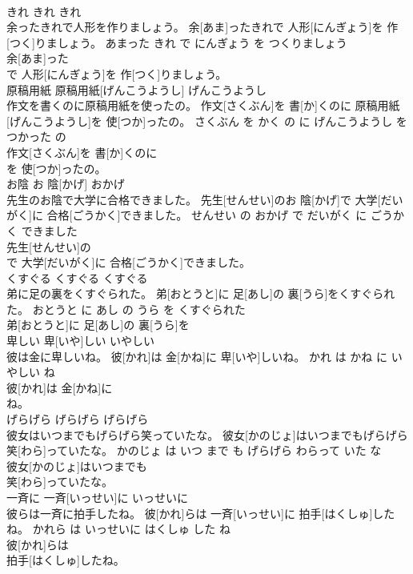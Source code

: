 \documentclass[8pt]{extreport}
\begin{document}
\begin{CJK}{UTF8}{min}
\\	きれ	きれ	きれ	
\\	余ったきれで人形を作りましょう。	余[あま]ったきれで 人形[にんぎょう]を 作[つく]りましょう。	あまった きれ で にんぎょう を つくりましょう	
\\	余[あま]った
\\	で 人形[にんぎょう]を 作[つく]りましょう。			
\\	原稿用紙	原稿用紙[げんこうようし]	げんこうようし	
\\	作文を書くのに原稿用紙を使ったの。	作文[さくぶん]を 書[か]くのに 原稿用紙[げんこうようし]を 使[つか]ったの。	さくぶん を かく の に げんこうようし を つかった の	
\\	作文[さくぶん]を 書[か]くのに
\\	を 使[つか]ったの。			
\\	お陰	お 陰[かげ]	おかげ	
\\	先生のお陰で大学に合格できました。	先生[せんせい]のお 陰[かげ]で 大学[だいがく]に 合格[ごうかく]できました。	せんせい の おかげ で だいがく に ごうかく できました	
\\	先生[せんせい]の
\\	で 大学[だいがく]に 合格[ごうかく]できました。			
\\	くすぐる	くすぐる	くすぐる	
\\	弟に足の裏をくすぐられた。	弟[おとうと]に 足[あし]の 裏[うら]をくすぐられた。	おとうと に あし の うら を くすぐられた	
\\	弟[おとうと]に 足[あし]の 裏[うら]を
\\	卑しい	卑[いや]しい	いやしい	
\\	彼は金に卑しいね。	彼[かれ]は 金[かね]に 卑[いや]しいね。	かれ は かね に いやしい ね	
\\	彼[かれ]は 金[かね]に
\\	ね。			
\\	げらげら	げらげら	げらげら	
\\	彼女はいつまでもげらげら笑っていたな。	彼女[かのじょ]はいつまでもげらげら 笑[わら]っていたな。	かのじょ は いつ まで も げらげら わらって いた な	
\\	彼女[かのじょ]はいつまでも
\\	笑[わら]っていたな。			
\\	一斉に	一斉[いっせい]に	いっせいに	
\\	彼らは一斉に拍手したね。	彼[かれ]らは 一斉[いっせい]に 拍手[はくしゅ]したね。	かれら は いっせいに はくしゅ した ね	
\\	彼[かれ]らは
\\	拍手[はくしゅ]したね。			

\end{CJK}
\end{document}
